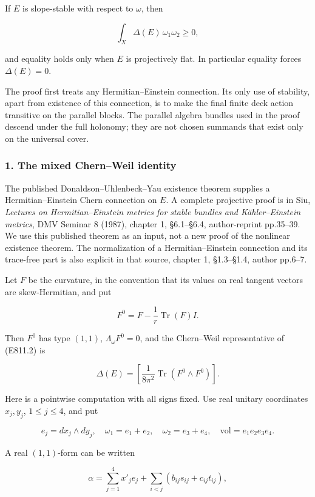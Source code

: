 If \(E\) is slope-stable with respect to \(\omega\), then

\[
 \int_X\Delta(E)\,\omega_1\omega_2\ge0,
\]

and equality holds only when \(E\) is projectively flat. In particular
equality forces \(\Delta(E)=0\).

The proof first treats any Hermitian--Einstein connection. Its only use
of stability, apart from existence of this connection, is to make the
final finite deck action transitive on the parallel blocks. The parallel
algebra bundles used in the proof descend under the full holonomy; they
are not chosen summands that exist only on the universal cover.

\subsubsection{1. The mixed Chern--Weil
identity}\label{the-mixed-chernweil-identity}

The published Donaldson--Uhlenbeck--Yau existence theorem supplies a
Hermitian--Einstein Chern connection on \(E\). A complete projective
proof is in Siu, \emph{Lectures on Hermitian--Einstein metrics for
stable bundles and Kähler--Einstein metrics}, DMV Seminar 8 (1987),
chapter 1, §6.1--§6.4, author-reprint pp.35--39. We use this published
theorem as an input, not a new proof of the nonlinear existence theorem.
The normalization of a Hermitian--Einstein connection and its trace-free
part is also explicit in that source, chapter 1, §1.3--§1.4, author
pp.6--7.

Let \(F\) be the curvature, in the convention that its values on real
tangent vectors are skew-Hermitian, and put

\[
 F^0=F-\frac1r\operatorname{Tr}(F)I.
\]

Then \(F^0\) has type \((1,1)\), \(\Lambda_\omega F^0=0\), and the
Chern--Weil representative of (E811.2) is

\[
 \Delta(E)=\left[\frac1{8\pi^2}\operatorname{Tr}(F^0\wedge F^0)\right].
 \tag{E811.3}
\]

Here is a pointwise computation with all signs fixed. Use real unitary
coordinates \(x_j,y_j\), \(1\le j\le4\), and put

\[
 e_j=dx_j\wedge dy_j,\quad
 \omega_1=e_1+e_2,\quad\omega_2=e_3+e_4,\quad
 \mathrm{vol}=e_1e_2e_3e_4.
\]

A real \((1,1)\)-form can be written

\[
 \alpha=\sum_{j=1}^4 x'_j e_j+
 \sum_{i<j}\left(b_{ij}s_{ij}+c_{ij}t_{ij}\right),
\]

